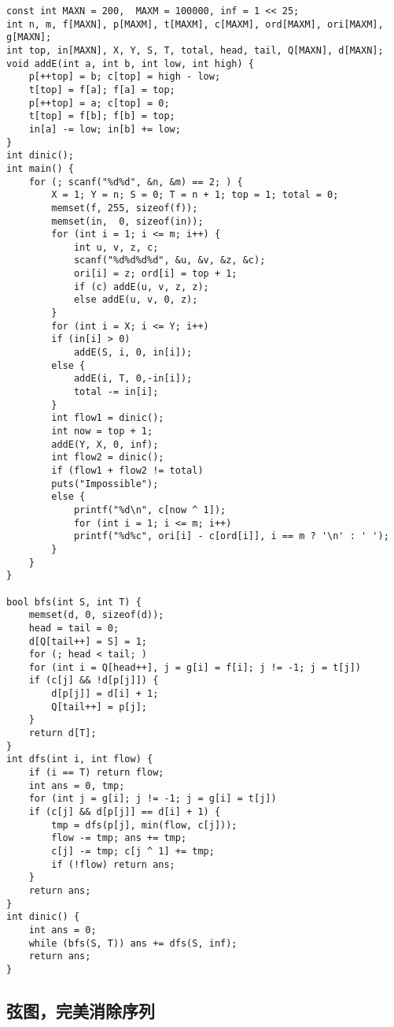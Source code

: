 \documentclass{article}
\begin{document}
\begin{lstlisting}
const int MAXN = 200,  MAXM = 100000, inf = 1 << 25;
int n, m, f[MAXN], p[MAXM], t[MAXM], c[MAXM], ord[MAXM], ori[MAXM], g[MAXN];
int top, in[MAXN], X, Y, S, T, total, head, tail, Q[MAXN], d[MAXN];
void addE(int a, int b, int low, int high) {
    p[++top] = b; c[top] = high - low;
    t[top] = f[a]; f[a] = top;
    p[++top] = a; c[top] = 0;
    t[top] = f[b]; f[b] = top;
    in[a] -= low; in[b] += low;
}
int dinic();
int main() {
    for (; scanf("%d%d", &n, &m) == 2; ) {
        X = 1; Y = n; S = 0; T = n + 1; top = 1; total = 0;
        memset(f, 255, sizeof(f));
        memset(in,  0, sizeof(in));
        for (int i = 1; i <= m; i++) {
            int u, v, z, c;
            scanf("%d%d%d%d", &u, &v, &z, &c);
            ori[i] = z; ord[i] = top + 1;
            if (c) addE(u, v, z, z);
            else addE(u, v, 0, z);
        }
        for (int i = X; i <= Y; i++)
        if (in[i] > 0)
            addE(S, i, 0, in[i]);
        else {
            addE(i, T, 0,-in[i]);
            total -= in[i];
        }
        int flow1 = dinic();
        int now = top + 1;
        addE(Y, X, 0, inf);
        int flow2 = dinic();
        if (flow1 + flow2 != total)
        puts("Impossible");
        else {
            printf("%d\n", c[now ^ 1]);
            for (int i = 1; i <= m; i++)
            printf("%d%c", ori[i] - c[ord[i]], i == m ? '\n' : ' ');
        }
    }
}

bool bfs(int S, int T) {
    memset(d, 0, sizeof(d));
    head = tail = 0;
    d[Q[tail++] = S] = 1;
    for (; head < tail; )
    for (int i = Q[head++], j = g[i] = f[i]; j != -1; j = t[j])
    if (c[j] && !d[p[j]]) {
        d[p[j]] = d[i] + 1;
        Q[tail++] = p[j];
    }
    return d[T];
}
int dfs(int i, int flow) {
    if (i == T) return flow;
    int ans = 0, tmp;
    for (int j = g[i]; j != -1; j = g[i] = t[j])
    if (c[j] && d[p[j]] == d[i] + 1) {
        tmp = dfs(p[j], min(flow, c[j]));
        flow -= tmp; ans += tmp;
        c[j] -= tmp; c[j ^ 1] += tmp;
        if (!flow) return ans;
    }
    return ans;
}
int dinic() {
    int ans = 0;
    while (bfs(S, T)) ans += dfs(S, inf);
    return ans;
}
\end{lstlisting}

\subsection{弦图，完美消除序列}
\end{document}

